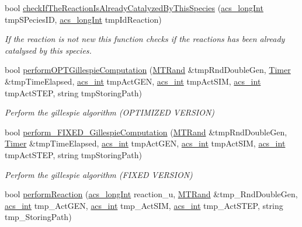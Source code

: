 \begin{DoxyCompactItemize}
bool \hyperlink{a00003_ac4c90b07b8e75ea03e2ced0ea644a69f}{check\-If\-The\-Reaction\-Is\-Already\-Catalyzed\-By\-This\-Species} (\hyperlink{a00016_a19319d75f02db4308bc5c0026d98cd85}{acs\-\_\-long\-Int} tmp\-S\-Pecies\-I\-D, \hyperlink{a00016_a19319d75f02db4308bc5c0026d98cd85}{acs\-\_\-long\-Int} tmp\-Id\-Reaction)
\begin{DoxyCompactList}\small\item\em If the reaction is not new this function checks if the reactions has been already catalysed by this species. \end{DoxyCompactList}\item 
bool \hyperlink{a00003_ad4dcf928538066ff8a501dc7f72ac750}{perform\-O\-P\-T\-Gillespie\-Computation} (\hyperlink{a00008}{M\-T\-Rand} \&tmp\-Rnd\-Double\-Gen, \hyperlink{a00015}{Timer} \&tmp\-Time\-Elapsed, \hyperlink{a00016_a8d277355641a098190360234e2ebde35}{acs\-\_\-int} tmp\-Act\-G\-E\-N, \hyperlink{a00016_a8d277355641a098190360234e2ebde35}{acs\-\_\-int} tmp\-Act\-S\-I\-M, \hyperlink{a00016_a8d277355641a098190360234e2ebde35}{acs\-\_\-int} tmp\-Act\-S\-T\-E\-P, string tmp\-Storing\-Path)
\begin{DoxyCompactList}\small\item\em Perform the gillespie algorithm (O\-P\-T\-I\-M\-I\-Z\-E\-D V\-E\-R\-S\-I\-O\-N) \end{DoxyCompactList}\item 
bool \hyperlink{a00003_a847f333ec6acea11f2d0fc99bab52586}{perform\-\_\-\-F\-I\-X\-E\-D\-\_\-\-Gillespie\-Computation} (\hyperlink{a00008}{M\-T\-Rand} \&tmp\-Rnd\-Double\-Gen, \hyperlink{a00015}{Timer} \&tmp\-Time\-Elapsed, \hyperlink{a00016_a8d277355641a098190360234e2ebde35}{acs\-\_\-int} tmp\-Act\-G\-E\-N, \hyperlink{a00016_a8d277355641a098190360234e2ebde35}{acs\-\_\-int} tmp\-Act\-S\-I\-M, \hyperlink{a00016_a8d277355641a098190360234e2ebde35}{acs\-\_\-int} tmp\-Act\-S\-T\-E\-P, string tmp\-Storing\-Path)
\begin{DoxyCompactList}\small\item\em Perform the gillespie algorithm (F\-I\-X\-E\-D V\-E\-R\-S\-I\-O\-N) \end{DoxyCompactList}\item 
bool \hyperlink{a00003_a1db4e67ba458a54f4fab3e10a203765c}{perform\-Reaction} (\hyperlink{a00016_a19319d75f02db4308bc5c0026d98cd85}{acs\-\_\-long\-Int} reaction\-\_\-u, \hyperlink{a00008}{M\-T\-Rand} \&tmp\-\_\-\-Rnd\-Double\-Gen, \hyperlink{a00016_a8d277355641a098190360234e2ebde35}{acs\-\_\-int} tmp\-\_\-\-Act\-G\-E\-N, \hyperlink{a00016_a8d277355641a098190360234e2ebde35}{acs\-\_\-int} tmp\-\_\-\-Act\-S\-I\-M, \hyperlink{a00016_a8d277355641a098190360234e2ebde35}{acs\-\_\-int} tmp\-\_\-\-Act\-S\-T\-E\-P, string tmp\-\_\-\-Storing\-Path)

\end{DoxyCompactItemize}
